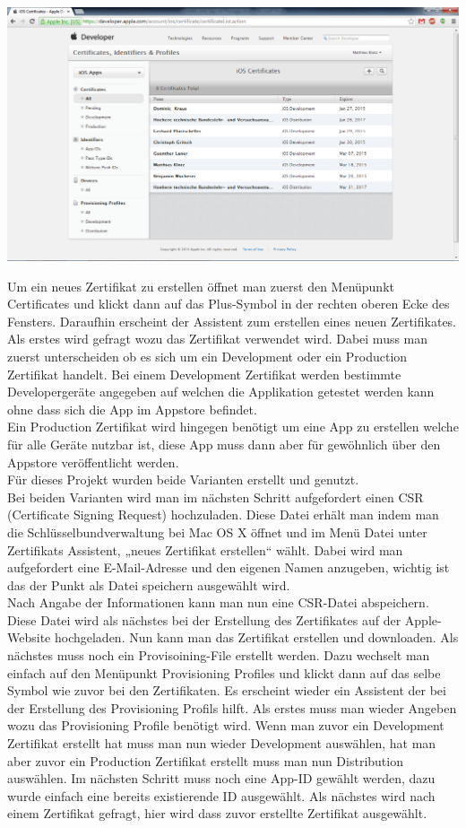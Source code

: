 \includegraphics[keepaspectratio=true, width=14cm]{images/phoneGap/AppleMemberCenter2.png}

Um ein neues Zertifikat zu erstellen öffnet man zuerst den Menüpunkt Certificates und klickt dann auf das Plus-Symbol in der rechten oberen Ecke des Fensters. Daraufhin erscheint der Assistent zum erstellen eines neuen Zertifikates.
Als erstes wird gefragt wozu das Zertifikat verwendet wird. Dabei muss man zuerst unterscheiden ob es sich um ein Development oder ein Production Zertifikat handelt. Bei einem Development Zertifikat
werden bestimmte Developergeräte angegeben auf welchen die Applikation getestet werden kann ohne dass sich die App im Appstore befindet.\\
Ein Production Zertifikat wird hingegen benötigt um eine App zu erstellen welche für alle Geräte nutzbar ist, diese App muss dann aber für gewöhnlich über den Appstore veröffentlicht werden.\\
Für dieses Projekt wurden beide Varianten erstellt und genutzt.\\
Bei beiden Varianten wird man im nächsten Schritt aufgefordert einen CSR (Certificate Signing Request) hochzuladen. Diese Datei erhält man indem man die Schlüsselbundverwaltung bei Mac OS X öffnet und im Menü Datei unter Zertifikats Assistent, „neues Zertifikat erstellen“ wählt. Dabei wird man aufgefordert eine E-Mail-Adresse und den eigenen Namen anzugeben, wichtig ist das der Punkt als Datei speichern ausgewählt wird.\\
Nach Angabe der Informationen kann man nun eine CSR-Datei abspeichern. Diese Datei wird als nächstes bei der Erstellung des Zertifikates auf der Apple-Website hochgeladen. Nun kann man das Zertifikat erstellen und downloaden.
Als nächstes muss noch ein Provisoining-File erstellt werden. Dazu wechselt man einfach auf den Menüpunkt Provisioning Profiles und klickt dann auf das selbe Symbol wie zuvor bei den Zertifikaten. Es erscheint wieder ein Assistent der bei der Erstellung des Provisioning Profils hilft. Als erstes muss man wieder Angeben wozu das Provisioning Profile benötigt wird. Wenn man zuvor ein Development Zertifikat erstellt hat muss man nun wieder Development auswählen, hat man aber zuvor ein Production Zertifikat erstellt muss man nun Distribution auswählen. Im nächsten Schritt muss noch eine App-ID gewählt werden, dazu wurde einfach eine bereits existierende ID ausgewählt. Als nächstes wird nach einem Zertifikat gefragt, hier wird dass zuvor erstellte Zertifikat ausgewählt.\\

